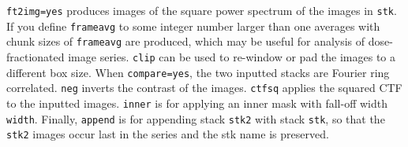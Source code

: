 \documentclass[a4paper,11pt]{article}
\begin{document}
\texttt{ft2img=yes} produces images of the square power spectrum of the images in \texttt{stk}. If you define \texttt{frameavg} to some integer number larger than one averages with chunk sizes of \texttt{frameavg} are produced, which may be useful for analysis of dose-fractionated image series. \texttt{clip} can be used to re-window or pad the images to a different box size. When \texttt{compare=yes}, the two inputted stacks are Fourier ring correlated. \texttt{neg} inverts the contrast of the images. \texttt{ctfsq} applies the squared CTF to the inputted images. \texttt{inner} is for applying an inner mask with fall-off width \texttt{width}. Finally, \texttt{append} is for appending stack \texttt{stk2} with stack \texttt{stk}, so that the \texttt{stk2} images occur last in the series and the stk name is preserved.
\end{document}

